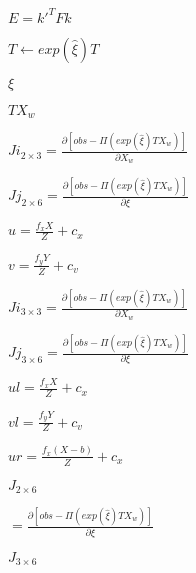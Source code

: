 \documentclass{article}
\begin{document}
$ E = k'^T F k $
\pagebreak

$ T \leftarrow exp(\hat{\xi})T $
\pagebreak

$ \xi $
\pagebreak

$ TX_w $
\pagebreak

$Ji_{2\times3} = \frac{\partial [obs - \Pi(exp(\hat{\xi}) T X_w)]}{\partial X_w} $
\pagebreak

$Jj_{2\times6} = \frac{\partial [obs - \Pi(exp(\hat{\xi}) T X_w)]}{\partial \xi} $
\pagebreak

$ u = \frac{f_x X}{Z} + c_x $
\pagebreak

$ v = \frac{f_y Y}{Z} + c_v $
\pagebreak

$Ji_{3\times3} = \frac{\partial [obs - \Pi(exp(\hat{\xi}) T X_w)]}{\partial X_w} $
\pagebreak

$Jj_{3\times6} = \frac{\partial [obs - \Pi(exp(\hat{\xi}) T X_w)]}{\partial \xi} $
\pagebreak

$ ul = \frac{f_x X}{Z} + c_x $
\pagebreak

$ vl = \frac{f_y Y}{Z} + c_v $
\pagebreak

$ ur = \frac{f_x (X-b)}{Z} + c_x $
\pagebreak

$J_{2\times6}$
\pagebreak

$ = \frac{\partial [obs - \Pi(exp(\hat{\xi}) T X_w)]}{\partial \xi} $
\pagebreak

$J_{3\times6}$
\pagebreak
\end{document}
